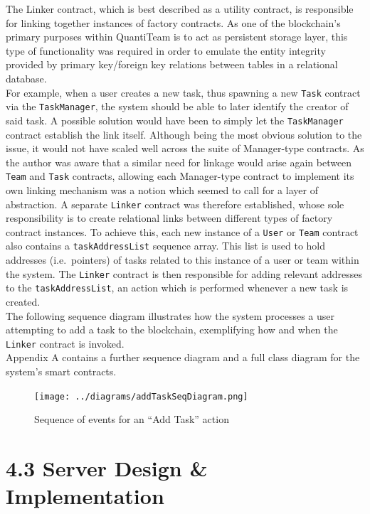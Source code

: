 The Linker contract, which is best described as a utility contract, is
responsible for linking together instances of factory contracts. As one
of the blockchain's primary purposes within QuantiTeam is to act as
persistent storage layer, this type of functionality was required in
order to emulate the entity integrity provided by primary key/foreign
key relations between tables in a relational
database\cite{1primarykeyforeignkey}.\\
For example, when a user creates a new task, thus spawning a new
\texttt{Task} contract via the \texttt{TaskManager}, the system should
be able to later identify the creator of said task. A possible solution
would have been to simply let the \texttt{TaskManager} contract
establish the link itself. Although being the most obvious solution to
the issue, it would not have scaled well across the suite of
Manager-type contracts. As the author was aware that a similar need for
linkage would arise again between \texttt{Team} and \texttt{Task}
contracts, allowing each Manager-type contract to implement its own
linking mechanism was a notion which seemed to call for a layer of
abstraction. A separate \texttt{Linker} contract was therefore
established, whose sole responsibility is to create relational links
between different types of factory contract instances. To achieve this,
each new instance of a \texttt{User} or \texttt{Team} contract also
contains a \texttt{taskAddressList} sequence array. This list is used to
hold addresses (i.e.~pointers) of tasks related to this instance of a
user or team within the system. The \texttt{Linker} contract is then
responsible for adding relevant addresses to the
\texttt{taskAddressList}, an action which is performed whenever a new
task is created.\\
The following sequence diagram illustrates how the system processes a
user attempting to add a task to the blockchain, exemplifying how and
when the \texttt{Linker} contract is invoked.\\
Appendix A contains a further sequence diagram and a full class diagram for the system's smart contracts.

\begin{figure}[htbp]
\centering
\texttt{[image: ../diagrams/addTaskSeqDiagram.png]}
\caption{Sequence of events for an ``Add Task'' action}
\end{figure}

\section{4.3 Server Design \&
Implementation}\label{server-design-implementation}

